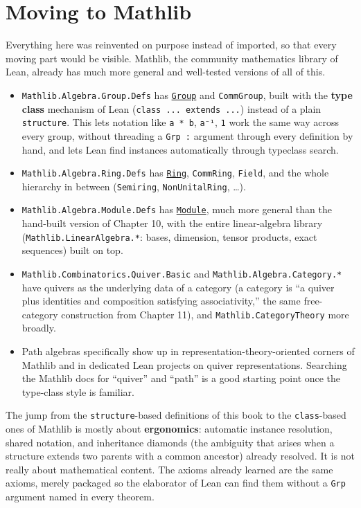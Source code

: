 \section{Moving to Mathlib}\label{sec:13-next-steps:02-moving-to-mathlib:1}

Everything here was reinvented on purpose instead of imported, so that every moving part would be visible. Mathlib, the community mathematics library of Lean, already has much more general and well-tested versions of all of this.

\begin{itemize}
\tightlist
\item
  \texttt{Mathlib.Algebra.Group.Defs} has \href{https://loogle.lean-lang.org/?q=Group}{\texttt{Group}} and \texttt{CommGroup}, built with the \textbf{type class} mechanism of Lean (\texttt{class ... extends ...}) instead of a plain \texttt{structure}. This lets notation like \texttt{a * b}, \texttt{a⁻¹}, \texttt{1} work the same way across every group, without threading a \texttt{Grp :} argument through every definition by hand, and lets Lean find instances automatically through typeclass search.
\item
  \texttt{Mathlib.Algebra.Ring.Defs} has \href{https://loogle.lean-lang.org/?q=Ring}{\texttt{Ring}}, \texttt{CommRing}, \texttt{Field}, and the whole hierarchy in between (\texttt{Semiring}, \texttt{NonUnitalRing}, \ldots).
\item
  \texttt{Mathlib.Algebra.Module.Defs} has \href{https://loogle.lean-lang.org/?q=Module}{\texttt{Module}}, much more general than the hand-built version of Chapter 10, with the entire linear-algebra library (\texttt{Mathlib.LinearAlgebra.*}: bases, dimension, tensor products, exact sequences) built on top.
\item
  \texttt{Mathlib.Combinatorics.Quiver.Basic} and \texttt{Mathlib.Algebra.Category.*} have quivers as the underlying data of a category (a category is ``a quiver plus identities and composition satisfying associativity,'' the same free-category construction from Chapter 11), and \texttt{Mathlib.CategoryTheory} more broadly.
\item
  Path algebras specifically show up in representation-theory-oriented corners of Mathlib and in dedicated Lean projects on quiver representations. Searching the Mathlib docs for ``quiver'' and ``path'' is a good starting point once the type-class style is familiar.
\end{itemize}

The jump from the \texttt{structure}-based definitions of this book to the \texttt{class}-based ones of Mathlib is mostly about \textbf{ergonomics}: automatic instance resolution, shared notation, and inheritance diamonds (the ambiguity that arises when a structure extends two parents with a common ancestor) already resolved. It is not really about mathematical content. The axioms already learned are the same axioms, merely packaged so the elaborator of Lean can find them without a \texttt{Grp} argument named in every theorem.


